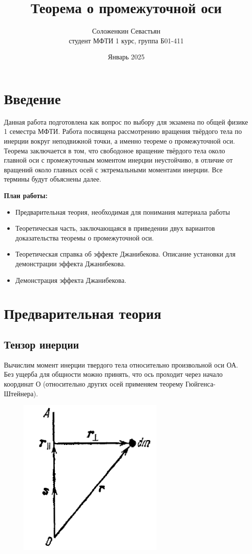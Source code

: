 \documentclass{article}
\title{Теорема о промежуточной оси}
\author{Соложенкин Севастьян \\ студент МФТИ 1 курс, группа Б01-411}
\date{Январь 2025}
\begin{document}
\maketitle

\section{Введение}
Данная работа подготовлена как вопрос по выбору для экзамена по общей физике 1 семестра МФТИ. Работа посвящена рассмотрению вращения твёрдого тела по инерции вокруг неподвижной точки, а именно теореме о промежуточной оси. Теорема заключается в том, что свободоное вращение твёрдого тела около главной оси с промежуточным моментом инерции неустойчиво, в отличие от вращений около главных осей с эктремальными моментами инерции. Все термины будут объяснены далее.  
\\
\par
\textbf{План работы:}
\begin{itemize}
    \item Предварительная теория, необходимая для понимания материала работы
    \item Теоретическая часть, заключающаяся в приведении двух вариантов доказательства теоремы о промежуточной оси.
    \item Теоретическая справка об эффекте Джанибекова. Описание установки для демонстрации эффекта Джанибекова.
    \item Демонстрация эффекта Джанибекова.
\end{itemize}

\section{Предварительная теория}
\label{Предварительная теория}
\subsection{Тензор инерции}

Вычислим момент инерции твердого тела относительно произвольной оси ОА. Без ущерба для общности можно принять, что ось проходит через начало координат О (относительно других осей применяем теорему Гюйгенса-Штейнера). 

\begin{figure} %
\centering
\includegraphics[width=0.5\linewidth]{tenzor.png}
\end{figure}
\end{document}
